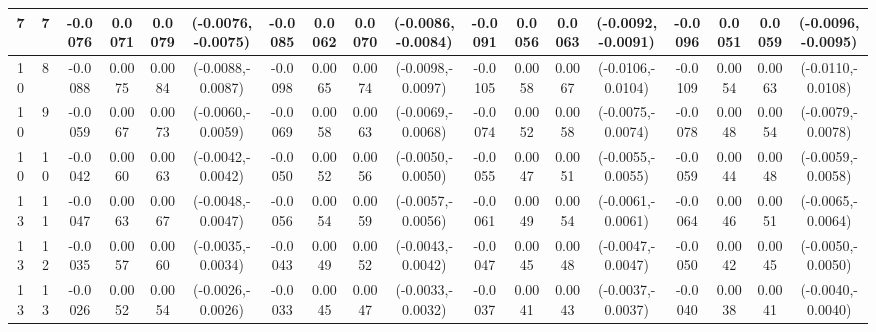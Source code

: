 \documentclass[12pt,a4paper]{article}
\numberwithin{equation}{section}
\begin{document}
\begin{table}
\begin{tabular}{cccccccccccccccccc}
7 & 7
& -0.0076 & 0.0071 & 0.0079 & (-0.0076,-0.0075)
& -0.0085 & 0.0062 & 0.0070 & (-0.0086,-0.0084)
& -0.0091 & 0.0056 & 0.0063 & (-0.0092,-0.0091)
& -0.0096 & 0.0051 & 0.0059 & (-0.0096,-0.0095) \\

\midrule

10 & 8
& -0.0088 & 0.0075 & 0.0084 & (-0.0088,-0.0087)
& -0.0098 & 0.0065 & 0.0074 & (-0.0098,-0.0097)
& -0.0105 & 0.0058 & 0.0067 & (-0.0106,-0.0104)
& -0.0109 & 0.0054 & 0.0063 & (-0.0110,-0.0108) \\

10 & 9
& -0.0059 & 0.0067 & 0.0073 & (-0.0060,-0.0059)
& -0.0069 & 0.0058 & 0.0063 & (-0.0069,-0.0068)
& -0.0074 & 0.0052 & 0.0058 & (-0.0075,-0.0074)
& -0.0078 & 0.0048 & 0.0054 & (-0.0079,-0.0078) \\

10 & 10
& -0.0042 & 0.0060 & 0.0063 & (-0.0042,-0.0042)
& -0.0050 & 0.0052 & 0.0056 & (-0.0050,-0.0050)
& -0.0055 & 0.0047 & 0.0051 & (-0.0055,-0.0055)
& -0.0059 & 0.0044 & 0.0048 & (-0.0059,-0.0058) \\

\midrule

13 & 11
& -0.0047 & 0.0063 & 0.0067 & (-0.0048,-0.0047)
& -0.0056 & 0.0054 & 0.0059 & (-0.0057,-0.0056)
& -0.0061 & 0.0049 & 0.0054 & (-0.0061,-0.0061)
& -0.0064 & 0.0046 & 0.0051 & (-0.0065,-0.0064) \\

13 & 12
& -0.0035 & 0.0057 & 0.0060 & (-0.0035,-0.0034)
& -0.0043 & 0.0049 & 0.0052 & (-0.0043,-0.0042)
& -0.0047 & 0.0045 & 0.0048 & (-0.0047,-0.0047)
& -0.0050 & 0.0042 & 0.0045 & (-0.0050,-0.0050) \\

13 & 13
& -0.0026 & 0.0052 & 0.0054 & (-0.0026,-0.0026)
& -0.0033 & 0.0045 & 0.0047 & (-0.0033,-0.0032)
& -0.0037 & 0.0041 & 0.0043 & (-0.0037,-0.0037)
& -0.0040 & 0.0038 & 0.0041 & (-0.0040,-0.0040) \\

\bottomrule
\end{tabular}
\end{table}

\newpage
\end{document}
